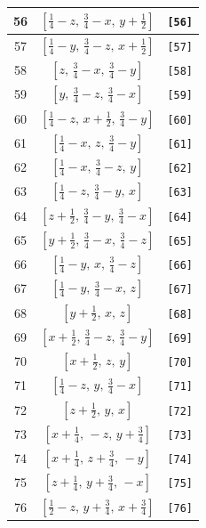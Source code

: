 \documentclass[fleqn,8pt]{jsarticle}
\begin{document}
\begin{longtable}{ccc}
56 & $\left[ \frac{1}{4} - z,\, \frac{3}{4} - x,\, y + \frac{1}{2} \right]$ & {\tt [56]} \\ \hline
57 & $\left[ \frac{1}{4} - y,\, \frac{3}{4} - z,\, x + \frac{1}{2} \right]$ & {\tt [57]} \\ \hline
58 & $\left[ z,\, \frac{3}{4} - x,\, \frac{3}{4} - y \right]$ & {\tt [58]} \\ \hline
59 & $\left[ y,\, \frac{3}{4} - z,\, \frac{3}{4} - x \right]$ & {\tt [59]} \\ \hline
60 & $\left[ \frac{1}{4} - z,\, x + \frac{1}{2},\, \frac{3}{4} - y \right]$ & {\tt [60]} \\ \hline
61 & $\left[ \frac{1}{4} - x,\, z,\, \frac{3}{4} - y \right]$ & {\tt [61]} \\ \hline
62 & $\left[ \frac{1}{4} - x,\, \frac{3}{4} - z,\, y \right]$ & {\tt [62]} \\ \hline
63 & $\left[ \frac{1}{4} - z,\, \frac{3}{4} - y,\, x \right]$ & {\tt [63]} \\ \hline
64 & $\left[ z + \frac{1}{2},\, \frac{3}{4} - y,\, \frac{3}{4} - x \right]$ & {\tt [64]} \\ \hline
65 & $\left[ y + \frac{1}{2},\, \frac{3}{4} - x,\, \frac{3}{4} - z \right]$ & {\tt [65]} \\ \hline
66 & $\left[ \frac{1}{4} - y,\, x,\, \frac{3}{4} - z \right]$ & {\tt [66]} \\ \hline
67 & $\left[ \frac{1}{4} - y,\, \frac{3}{4} - x,\, z \right]$ & {\tt [67]} \\ \hline
68 & $\left[ y + \frac{1}{2},\, x,\, z \right]$ & {\tt [68]} \\ \hline
69 & $\left[ x + \frac{1}{2},\, \frac{3}{4} - z,\, \frac{3}{4} - y \right]$ & {\tt [69]} \\ \hline
70 & $\left[ x + \frac{1}{2},\, z,\, y \right]$ & {\tt [70]} \\ \hline
71 & $\left[ \frac{1}{4} - z,\, y,\, \frac{3}{4} - x \right]$ & {\tt [71]} \\ \hline
72 & $\left[ z + \frac{1}{2},\, y,\, x \right]$ & {\tt [72]} \\ \hline
73 & $\left[ x + \frac{1}{4},\, - z,\, y + \frac{3}{4} \right]$ & {\tt [73]} \\ \hline
74 & $\left[ x + \frac{1}{4},\, z + \frac{3}{4},\, - y \right]$ & {\tt [74]} \\ \hline
75 & $\left[ z + \frac{1}{4},\, y + \frac{3}{4},\, - x \right]$ & {\tt [75]} \\ \hline
76 & $\left[ \frac{1}{2} - z,\, y + \frac{3}{4},\, x + \frac{3}{4} \right]$ & {\tt [76]} \\ \hline

\end{longtable}
\end{document}
